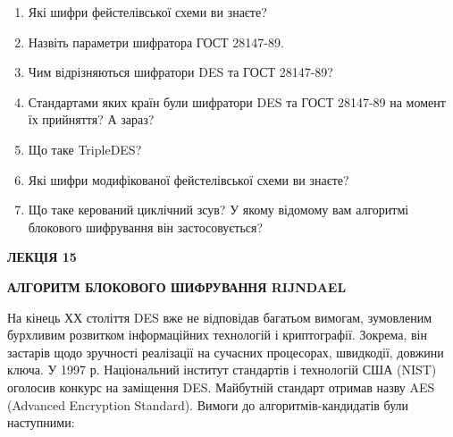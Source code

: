 \documentclass[a4paper]{article}
\newcommand\liststyleWWviiiNuml{%
\renewcommand\theenumi{\arabic{enumi}}
\renewcommand\theenumii{\alph{enumii}}
\renewcommand\theenumiii{\roman{enumiii}}
\renewcommand\theenumiv{\arabic{enumiv}}
\renewcommand\labelenumi{\theenumi.}
\renewcommand\labelenumii{\theenumii.}
\renewcommand\labelenumiii{\theenumiii.}
\renewcommand\labelenumiv{\theenumiv.}
}
\newcounter{}
\begin{document}
\liststyleWWviiiNuml
\begin{enumerate}
\item Які шифри фейстелівської схеми ви знаєте?
\item Назвіть параметри шифратора ГОСТ 28147-89.
\item Чим відрізняються шифратори DES та ГОСТ 28147-89?
\item Стандартами яких країн були шифратори DES та ГОСТ 28147-89 на момент їх
прийняття? А зараз?
\item Що таке TripleDES?
\item Які шифри модифікованої фейстелівської схеми ви знаєте?
\item Що таке керований циклічний зсув? У якому відомому вам алгоритмі блокового
шифрування він застосовується?
\end{enumerate}

\bigskip


\bigskip


\bigskip

{\bfseries
ЛЕКЦІЯ  15}


\bigskip

{\centering\bfseries
АЛГОРИТМ  БЛОКОВОГО  ШИФРУВАННЯ  RIJNDAEL
\par}


\bigskip


\bigskip

На кінець ХХ століття DES вже не відповідав багатьом вимогам, зумовленим
бурхливим розвитком інформаційних технологій і криптографії. Зокрема, він
застарів щодо зручності реалізації на сучасних процесорах, швидкодії, довжини
ключа. У 1997 р. Національний інститут стандартів і технологій США (NIST)
оголосив конкурс на заміщення DES. Майбутній стандарт отримав назву AES
(Advanced Encryption Standard). Вимоги до алгоритмів-кандидатів були
наступними:
\end{document}
